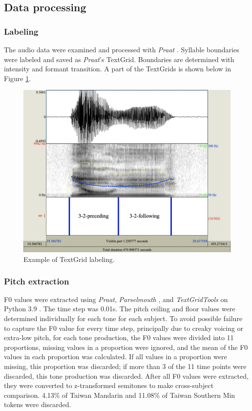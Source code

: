 \documentclass[12pt]{report}
\begin{document}
\begin{CJK}{UTF8}{bsmi}
\subsection{Data processing}
\subsubsection{Labeling}
The audio data were examined and processed with \textit{Praat} \citep{BoersmaWeenink2018}. Syllable boundaries were labeled and saved as \textit{Praat}’s TextGrid. Boundaries are determined with intensity and formant transition. A part of the TextGrids is shown below in Figure \ref{Figure:TextGridExample}.

\begin{figure}[hbt!]
\centering
\includegraphics[width=\textwidth]{Figures/E1/TextGridExample.jpg}
\caption{Example of TextGrid labeling.}
\label{Figure:TextGridExample}
\end{figure}

\subsubsection{Pitch extraction}\label{section:PitchExtraction}
F0 values were extracted using \textit{Praat}, \textit{Parselmouth} \citep{Jadouletal2018}, and \textit{TextGridTools} \citep{BuschmeierWlodarczak2013} on Python 3.9 \citep{vanRossumDrake2009}. The time step was 0.01s. The pitch ceiling and floor values were determined individually for each tone for each subject. To avoid possible failure to capture the F0 value for every time step, principally due to creaky voicing or extra-low pitch, for each tone production, the F0 values were divided into 11 proportions, missing values in a proportion were ignored, and the mean of the F0 values in each proportion was calculated. If all values in a proportion were missing, this proportion was discarded; if more than 3 of the 11 time points were discarded, this tone production was discarded. After all F0 values were extracted, they were converted to z-transformed semitones to make cross-subject comparison. 4.13\% of Taiwan Mandarin and 11.08\% of Taiwan Southern Min tokens were discarded.


\end{CJK}
\end{document}
